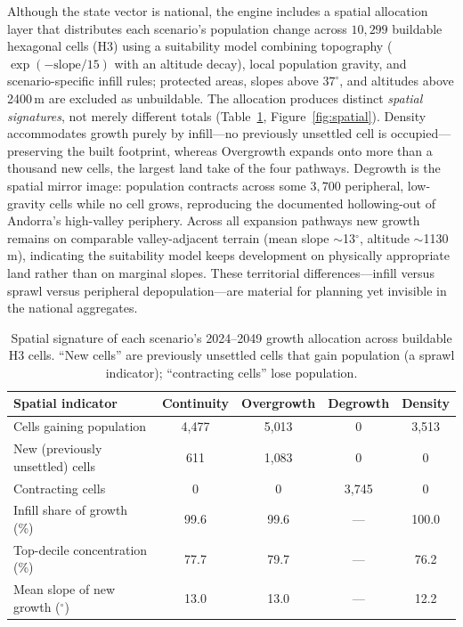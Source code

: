 \documentclass[urbansci,article,submit,pdftex,moreauthors]{Definitions/mdpi}
\begin{document}
Although the state vector is national, the engine includes a spatial allocation layer
that distributes each scenario's population change across $10{,}299$ buildable
hexagonal cells (H3) using a suitability model combining topography
($\exp(-\text{slope}/15)$ with an altitude decay), local population gravity, and
scenario-specific infill rules; protected areas, slopes above $37^\circ$, and
altitudes above 2400\,m are excluded as unbuildable. The allocation produces distinct
\emph{spatial signatures}, not merely different totals (Table~\ref{tab:spatial},
Figure~\ref{fig:spatial}). Density accommodates growth purely by infill---no previously
unsettled cell is occupied---preserving the built footprint, whereas Overgrowth expands
onto more than a thousand new cells, the largest land take of the four pathways.
Degrowth is the spatial mirror image: population contracts across some $3{,}700$
peripheral, low-gravity cells while no cell grows, reproducing the documented
hollowing-out of Andorra's high-valley periphery. Across all expansion pathways new
growth remains on comparable valley-adjacent terrain (mean slope $\sim$13$^\circ$,
altitude $\sim$1130\,m), indicating the suitability model keeps development on
physically appropriate land rather than on marginal slopes. These territorial
differences---infill versus sprawl versus peripheral depopulation---are material for
planning yet invisible in the national aggregates.

\begin{table}[H]
\caption{Spatial signature of each scenario's 2024--2049 growth allocation across
buildable H3 cells. ``New cells'' are previously unsettled cells that gain population
(a sprawl indicator); ``contracting cells'' lose population.}
\label{tab:spatial}
\begin{tabularx}{\textwidth}{Xcccc}
\toprule
\textbf{Spatial indicator} & \textbf{Continuity} & \textbf{Overgrowth}
                           & \textbf{Degrowth} & \textbf{Density} \\
\midrule
Cells gaining population         & 4{,}477 & 5{,}013 & 0       & 3{,}513 \\
New (previously unsettled) cells & 611     & 1{,}083 & 0       & 0 \\
Contracting cells                & 0       & 0       & 3{,}745 & 0 \\
Infill share of growth (\%)      & 99.6    & 99.6    & ---     & 100.0 \\
Top-decile concentration (\%)    & 77.7    & 79.7    & ---     & 76.2 \\
Mean slope of new growth ($^\circ$) & 13.0 & 13.0    & ---     & 12.2 \\
\bottomrule
\end{tabularx}
\end{table}
\end{document}
